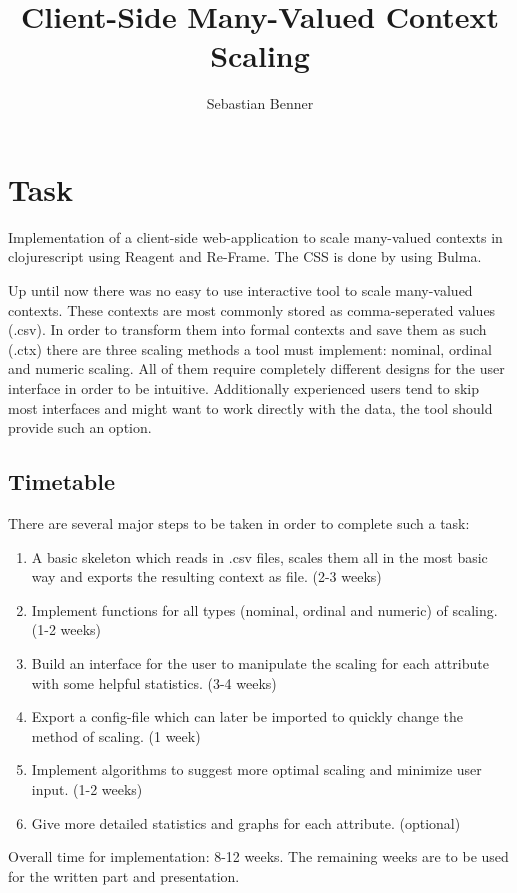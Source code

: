 \documentclass[]{report}
\title{Client-Side Many-Valued Context Scaling}
\author{Sebastian Benner}
\begin{document}
\maketitle

\tableofcontents

\chapter{Task}
Implementation of a client-side web-application to scale many-valued contexts in clojurescript using Reagent and Re-Frame. The CSS is done by using Bulma.

Up until now there was no easy to use interactive tool to scale many-valued contexts. These contexts are most commonly stored as comma-seperated values (.csv). In order to transform them into formal contexts and save them as such (.ctx) there are three scaling methods a tool must implement: nominal, ordinal and numeric scaling. All of them require completely different designs for the user interface in order to be intuitive. Additionally experienced users tend to skip most interfaces and might want to work directly with the data, the tool should provide such an option.

\section{Timetable}
There are several major steps to be taken in order to complete such a task:
\begin{enumerate}
	\item A basic skeleton which reads in .csv files, scales them all in the most basic way and exports the resulting context as file. (2-3 weeks)
	\item Implement functions for all types (nominal, ordinal and numeric) of scaling. (1-2 weeks)
	\item Build an interface for the user to manipulate the scaling for each attribute with some helpful statistics. (3-4 weeks)
	\item Export a config-file which can later be imported to quickly change the method of scaling. (1 week)
	\item Implement algorithms to suggest more optimal scaling and minimize user input. (1-2 weeks)
	\item Give more detailed statistics and graphs for each attribute. (optional)
\end{enumerate}
Overall time for implementation: 8-12 weeks. The remaining weeks are to be used for the written part and presentation.
\end{document}
